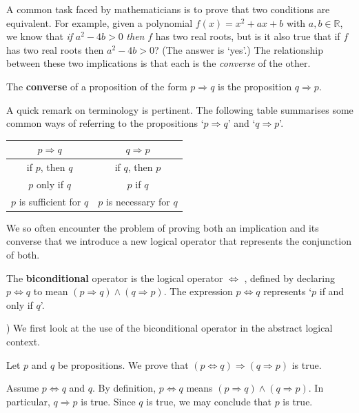 A common task faced by mathematicians is to prove that two conditions are equivalent. For example, given a polynomial $f(x) = x^2+ax+b$ with $a,b \in \mathbb{R}$, we know that \textit{if} $a^2-4b>0$ \textit{then} $f$ has two real roots, but is it also true that if $f$ has two real roots then $a^2-4b>0$? (The answer is `yes'.) The relationship between these two implications is that each is the \textit{converse} of the other.

\begin{definition}
\label{defConverse}
The \textbf{converse} of a proposition of the form $p \Rightarrow q$ is the proposition $q \Rightarrow p$.
\end{definition}

A quick remark on terminology is pertinent. The following table summarises some common ways of referring to the propositions `$p \Rightarrow q$' and `$q \Rightarrow p$'.

\begin{center}
\begin{tabular}{c|c}
$p \Rightarrow q$ & $q \Rightarrow p$ \\ \hline
if $p$, then $q$ & if $q$, then $p$ \\
$p$ only if $q$ & $p$ if $q$ \\
$p$ is sufficient for $q$ & $p$ is necessary for $q$
\end{tabular}
\end{center}

We so often encounter the problem of proving both an implication and its converse that we introduce a new logical operator that represents the conjunction of both.

\begin{definition}
\label{defBiconditional}
The \textbf{biconditional} operator is the logical operator $\Leftrightarrow$ , defined by declaring $p \Leftrightarrow q$ to mean $(p \Rightarrow q) \wedge (q \Rightarrow p)$. The expression $p \Leftrightarrow q$ represents `$p$ if and only if $q$'.
\end{definition}
)
We first look at the use of the biconditional operator in the abstract logical context.

\begin{example}
Let $p$ and $q$ be propositions. We prove that $(p \Leftrightarrow q) \Rightarrow (q \Rightarrow p)$ is true.

Assume $p \Leftrightarrow q$ and $q$. By definition, $p \Leftrightarrow q$ means $(p \Rightarrow q) \wedge (q \Rightarrow p)$. In particular, $q \Rightarrow p$ is true. Since $q$ is true, we may conclude that $p$ is true.
\end{example}

